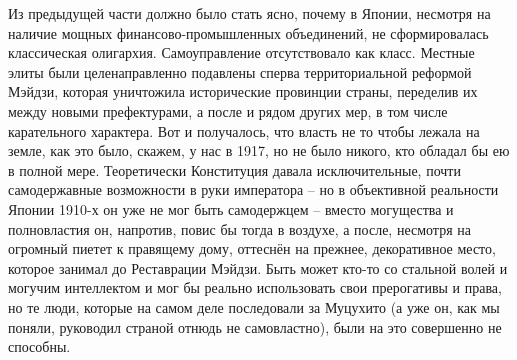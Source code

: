 Из предыдущей части должно было стать ясно, почему в Японии, несмотря на наличие мощных финансово-промышленных объединений, не сформировалась классическая олигархия. Самоуправление отсутствовало как класс. Местные элиты были целенаправленно подавлены сперва территориальной реформой Мэйдзи, которая уничтожила исторические провинции страны, переделив их между новыми префектурами, а после и рядом других мер, в том числе карательного характера. Вот и получалось, что власть не то чтобы лежала на земле, как это было, скажем, у нас в 1917, но не было никого, кто обладал бы ею в полной мере. Теоретически Конституция давала исключительные, почти самодержавные возможности в руки императора – но в объективной реальности Японии 1910-х он уже не мог быть самодержцем – вместо могущества и полновластия он, напротив, повис бы тогда в воздухе, а после, несмотря на огромный пиетет к правящему дому, оттеснён на прежнее, декоративное место, которое занимал до Реставрации Мэйдзи. Быть может кто-то со стальной волей и могучим интеллектом и мог бы реально использовать свои прерогативы и права, но те люди, которые на самом деле последовали за Муцухито (а уже он, как мы поняли, руководил страной отнюдь не самовластно), были на это совершенно не способны.

